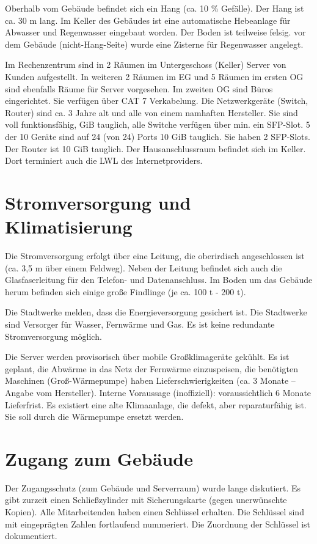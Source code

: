 \documentclass[a4paper,10pt]{scrreprt}
\begin{document}
Oberhalb vom Gebäude befindet sich ein Hang (ca. 10 \% Gefälle). Der Hang ist ca. 30 m lang. Im Keller des Gebäudes ist eine automatische Hebeanlage für Abwasser und Regenwasser eingebaut worden. Der Boden ist teilweise felsig. vor dem Gebäude (nicht-Hang-Seite) wurde eine Zisterne für Regenwasser angelegt.

Im Rechenzentrum sind in 2 Räumen im Untergeschoss (Keller) Server von Kunden aufgestellt. In weiteren 2 Räumen im EG und 5 Räumen im ersten OG sind ebenfalls Räume für Server vorgesehen. Im zweiten OG sind Büros eingerichtet. Sie verfügen über CAT 7 Verkabelung. Die Netzwerkgeräte (Switch, Router) sind ca. 3 Jahre alt und alle von einem namhaften Hersteller. Sie sind voll funktionsfähig, GiB tauglich, alle Switche verfügen über min. ein SFP-Slot. 5 der 10 Geräte sind auf 24 (von 24) Ports 10 GiB tauglich. Sie haben 2 SFP-Slots. Der Router ist 10 GiB tauglich. Der Hausanschlussraum befindet sich im Keller. Dort terminiert auch die LWL des Internetproviders.

\section{Stromversorgung und Klimatisierung}
Die Stromversorgung erfolgt über eine Leitung, die oberirdisch angeschlossen ist (ca. 3,5 m über einem Feldweg). Neben der Leitung befindet sich auch die Glasfaserleitung für den Telefon- und Datenanschluss. Im Boden um das Gebäude herum befinden sich einige große Findlinge (je ca. 100 t - 200 t).

Die Stadtwerke melden, dass die Energieversorgung gesichert ist. Die Stadtwerke sind Versorger für Wasser, Fernwärme und Gas. Es ist keine redundante Stromversorgung möglich.

Die Server werden provisorisch über mobile Großklimageräte gekühlt. Es ist geplant, die Abwärme in das Netz der Fernwärme einzuspeisen, die benötigten Maschinen (Groß-Wärmepumpe) haben Lieferschwierigkeiten (ca. 3 Monate -- Angabe vom Hersteller). Interne Voraussage (inoffiziell): voraussichtlich 6 Monate Lieferfrist. Es existiert eine alte Klimaanlage, die defekt, aber reparaturfähig ist. Sie soll durch die Wärmepumpe ersetzt werden.

\section{Zugang zum Gebäude}
Der Zugangsschutz (zum Gebäude und Serverraum) wurde lange diskutiert. Es gibt zurzeit einen Schließzylinder mit Sicherungskarte (gegen unerwünschte Kopien). Alle Mitarbeitenden haben einen Schlüssel erhalten. Die Schlüssel sind mit eingeprägten Zahlen fortlaufend nummeriert. Die Zuordnung der Schlüssel ist dokumentiert.
\end{document}
